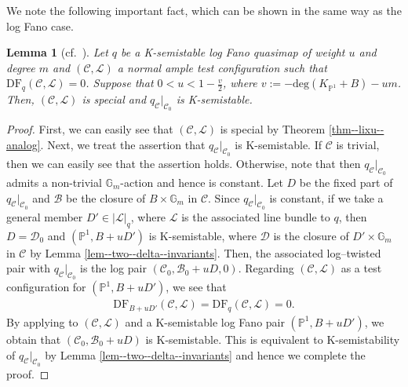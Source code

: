 \documentclass[12pt,twoside]{amsart}
\newtheorem{lem}[thm]{Lemma}
\theoremstyle{definition}
\begin{document}
We note the following important fact, which can be shown in the same way as the log Fano case. 


\begin{lem}[{cf.~\cite[Lemma 3.1]{LWX21}}]\label{lem--DF=0-case}
Let $q$ be a K-semistable log Fano quasimap of weight $u$ and degree $m$ and $(\mathcal{C},\mathcal{L})$ a normal ample test configuration such that $\mathrm{DF}_q(\mathcal{C},\mathcal{L})=0$.
Suppose that $0<u<1-\frac{v}{2}$, where $v:=-\mathrm{deg}(K_{\mathbb{P}^1}+B)-um$.
Then, $(\mathcal{C},\mathcal{L})$ is special and $q_{\mathcal{C}}|_{\mathcal{C}_0}$ is K-semistable.
\end{lem}

\begin{proof}
First, we can easily see that $(\mathcal{C},\mathcal{L})$ is special by Theorem \ref{thm--lixu--analog}.
Next, we treat the assertion that $q_{\mathcal{C}}|_{\mathcal{C}_0}$ is K-semistable.
    If $\mathcal{C}$ is trivial, then we can easily see that the assertion holds.  
    Otherwise, note that then $q_{\mathcal{C}}|_{\mathcal{C}_0}$ admits a non-trivial $\mathbb{G}_m$-action and hence is constant.
    Let $D$ be the fixed part of $q_{\mathcal{C}}|_{\mathcal{C}_0}$ and $\mathcal{B}$ be the closure of $B\times\mathbb{G}_m$ in $\mathcal{C}$.
    Since $q_{\mathcal{C}}|_{\mathcal{C}_0}$ is constant, if we take a general member $D'\in |\mathscr{L}|_q$, where $\mathscr{L}$ is the associated line bundle to $q$, then $D=\mathcal{D}_0$ and $(\mathbb{P}^1,B+uD')$ is K-semistable, where $\mathcal{D}$ is the closure of $D'\times \mathbb{G}_m$ in $\mathcal{C}$ by Lemma \ref{lem--two--delta--invariants}.
   Then, the associated log--twisted pair with $q_{\mathcal{C}}|_{\mathcal{C}_0}$ is the log pair $(\mathcal{C}_0,\mathcal{B}_0+uD,0)$.
    Regarding $(\mathcal{C},\mathcal{L})$ as a test configuration for $(\mathbb{P}^1,B+uD')$, we see that 
    \begin{align*}
        \mathrm{DF}_{B+uD'}(\mathcal{C},\mathcal{L})=\mathrm{DF}_{q}(\mathcal{C},\mathcal{L})=0.
    \end{align*}
   By applying \cite[Lemma 3.1]{LWX21} to $(\mathcal{C},\mathcal{L})$ and a K-semistable log Fano pair $(\mathbb{P}^1,B+uD')$,
    we obtain that $(\mathcal{C}_0,\mathcal{B}_0+uD)$ is K-semistable.
    This is equivalent to K-semistability of $q_{\mathcal{C}}|_{\mathcal{C}_0}$ by Lemma \ref{lem--two--delta--invariants} and hence we complete the proof.
\end{proof}
\end{document}
